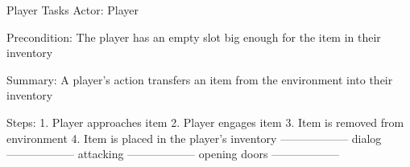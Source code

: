 \documentclass[12pt]{report}
\begin{document}
\begin{section}{Player Tasks}
Actor: Player

Precondition: The player has an empty slot big enough for the item in their inventory

Summary: A player's action transfers an item from the environment into their inventory

Steps:
1. Player approaches item
2. Player engages item
3. Item is removed from environment
4. Item is placed in the player's  inventory
------------------
dialog
------------------
attacking
------------------
opening doors
------------------


\end{section}
\end{document}
